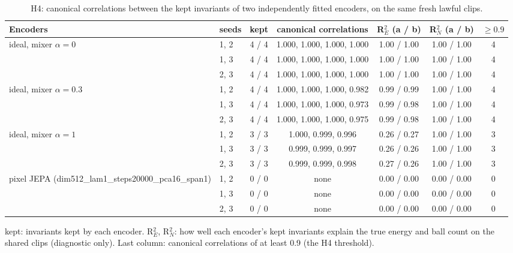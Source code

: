 \begin{table}[t]\centering\small
\caption{H4: canonical correlations between the kept invariants of two independently fitted encoders, on the same fresh lawful clips.}\label{tab:agreement}
\begin{adjustbox}{max width=\linewidth}\begin{tabular}{llccccc}\toprule
Encoders & seeds & kept & canonical correlations & R$^2_E$ (a / b) & R$^2_N$ (a / b) & $\ge 0.9$\\\midrule
ideal, mixer $\alpha=0$ & 1, 2 & 4 / 4 & 1.000, 1.000, 1.000, 1.000 & 1.00 / 1.00 & 1.00 / 1.00 & 4\\
 & 1, 3 & 4 / 4 & 1.000, 1.000, 1.000, 1.000 & 1.00 / 1.00 & 1.00 / 1.00 & 4\\
 & 2, 3 & 4 / 4 & 1.000, 1.000, 1.000, 1.000 & 1.00 / 1.00 & 1.00 / 1.00 & 4\\
\midrule
ideal, mixer $\alpha=0.3$ & 1, 2 & 4 / 4 & 1.000, 1.000, 1.000, 0.982 & 0.99 / 0.99 & 1.00 / 1.00 & 4\\
 & 1, 3 & 4 / 4 & 1.000, 1.000, 1.000, 0.973 & 0.99 / 0.98 & 1.00 / 1.00 & 4\\
 & 2, 3 & 4 / 4 & 1.000, 1.000, 1.000, 0.975 & 0.99 / 0.98 & 1.00 / 1.00 & 4\\
\midrule
ideal, mixer $\alpha=1$ & 1, 2 & 3 / 3 & 1.000, 0.999, 0.996 & 0.26 / 0.27 & 1.00 / 1.00 & 3\\
 & 1, 3 & 3 / 3 & 0.999, 0.999, 0.997 & 0.26 / 0.26 & 1.00 / 1.00 & 3\\
 & 2, 3 & 3 / 3 & 0.999, 0.999, 0.998 & 0.27 / 0.26 & 1.00 / 1.00 & 3\\
\midrule
pixel JEPA (dim512\_lam1\_steps20000\_pca16\_span1) & 1, 2 & 0 / 0 & none & 0.00 / 0.00 & 0.00 / 0.00 & 0\\
 & 1, 3 & 0 / 0 & none & 0.00 / 0.00 & 0.00 / 0.00 & 0\\
 & 2, 3 & 0 / 0 & none & 0.00 / 0.00 & 0.00 / 0.00 & 0\\
\bottomrule
\end{tabular}\end{adjustbox}
\par\smallskip\footnotesize kept: invariants kept by each encoder. R$^2_E$, R$^2_N$: how well each encoder's kept invariants explain the true energy and ball count on the shared clips (diagnostic only). Last column: canonical correlations of at least 0.9 (the H4 threshold).
\end{table}
